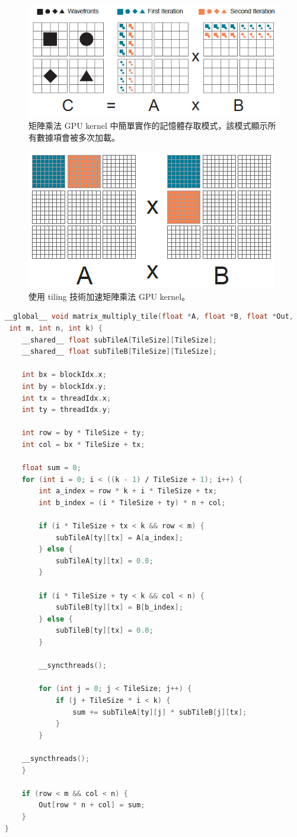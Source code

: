 \begin{figure}[h]
    \centering
    \includegraphics[width=0.7\linewidth]{FileAusiliari/Screenshots/Figure8-7.png}
    \caption{矩陣乘法 GPU kernel 中簡單實作的記憶體存取模式，該模式顯示所有數據項會被多次加載。}
    \label{fig:memory}
\end{figure}

\begin{figure}[h]
    \centering
    \includegraphics[width=0.6\linewidth]{FileAusiliari/Screenshots/Figure8-8.png}
    \caption{使用 tiling 技術加速矩陣乘法 GPU kernel。}
    \label{fig:tiling}
\end{figure}

\begin{lstlisting}[language=C, caption={基於 tiling 的 HIP kernel 用於矩陣乘法。}, captionpos=t, label={lst:tiling}]
__global__ void matrix_multiply_tile(float *A, float *B, float *Out,
 int m, int n, int k) {
    __shared__ float subTileA[TileSize][TileSize];
    __shared__ float subTileB[TileSize][TileSize];

    int bx = blockIdx.x;
    int by = blockIdx.y;
    int tx = threadIdx.x;
    int ty = threadIdx.y;

    int row = by * TileSize + ty;
    int col = bx * TileSize + tx;

    float sum = 0;
    for (int i = 0; i < ((k - 1) ∕ TileSize + 1); i++) {
        int a_index = row * k + i * TileSize + tx;
        int b_index = (i * TileSize + ty) * n + col;

        if (i * TileSize + tx < k && row < m) {
            subTileA[ty][tx] = A[a_index];
        } else {
            subTileA[ty][tx] = 0.0;
        }

        if (i * TileSize + ty < k && col < n) {
            subTileB[ty][tx] = B[b_index];
        } else {
            subTileB[ty][tx] = 0.0;
        }

        __syncthreads();

        for (int j = 0; j < TileSize; j++) {
            if (j + TileSize * i < k) {
                sum += subTileA[ty][j] * subTileB[j][tx];
            }
        }

    __syncthreads();
    }

    if (row < m && col < n) {
        Out[row * n + col] = sum;
    }
}
\end{lstlisting}

